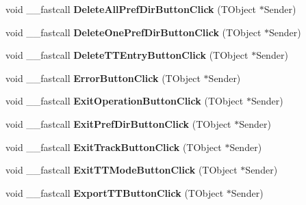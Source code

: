 \begin{DoxyCompactItemize}
\mbox{\label{class_t_interface_af9cb95043f5276df55cb6809e104c93a}} 
void \+\_\+\+\_\+fastcall {\bfseries Delete\+All\+Pref\+Dir\+Button\+Click} (T\+Object $\ast$Sender)
\item 
\mbox{\label{class_t_interface_a3136530959237eaa57486f4f48357855}} 
void \+\_\+\+\_\+fastcall {\bfseries Delete\+One\+Pref\+Dir\+Button\+Click} (T\+Object $\ast$Sender)
\item 
\mbox{\label{class_t_interface_abdd4a70649a10a29c9a069d040072808}} 
void \+\_\+\+\_\+fastcall {\bfseries Delete\+T\+T\+Entry\+Button\+Click} (T\+Object $\ast$Sender)
\item 
\mbox{\label{class_t_interface_adec6eee7e3b3314673198431c4b1f777}} 
void \+\_\+\+\_\+fastcall {\bfseries Error\+Button\+Click} (T\+Object $\ast$Sender)
\item 
\mbox{\label{class_t_interface_a3e59d6f1f39ffe34a9d6e7bf930acbff}} 
void \+\_\+\+\_\+fastcall {\bfseries Exit\+Operation\+Button\+Click} (T\+Object $\ast$Sender)
\item 
\mbox{\label{class_t_interface_ab2a25d27dcbae558b8f9a4ac62937523}} 
void \+\_\+\+\_\+fastcall {\bfseries Exit\+Pref\+Dir\+Button\+Click} (T\+Object $\ast$Sender)
\item 
\mbox{\label{class_t_interface_ad0fa9f32b059b346e066ab23d62a4bfc}} 
void \+\_\+\+\_\+fastcall {\bfseries Exit\+Track\+Button\+Click} (T\+Object $\ast$Sender)
\item 
\mbox{\label{class_t_interface_aa78089df3d8323be6fde98c0ee48424c}} 
void \+\_\+\+\_\+fastcall {\bfseries Exit\+T\+T\+Mode\+Button\+Click} (T\+Object $\ast$Sender)
\item 
\mbox{\label{class_t_interface_ab7c52bd31930036c95b9b71c2f1f0426}} 
void \+\_\+\+\_\+fastcall {\bfseries Export\+T\+T\+Button\+Click} (T\+Object $\ast$Sender)
\item 
\mbox{\label{class_t_interface_a167410ef8c1ebe53abd0afee71943ecf}} 

\end{DoxyCompactItemize}
